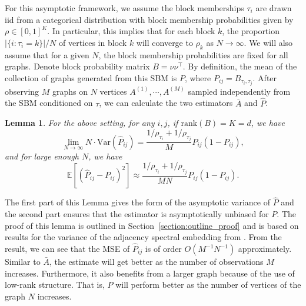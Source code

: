 \documentclass[10pt,letterpaper]{article}
\newtheorem{lemma}[fact]{Lemma}
\newcommand{\Ex}{\mathbb{E}}
\renewcommand{\hat}{\widehat}
\begin{document}
For this asymptotic framework, we assume the block memberships $\tau_i$ are drawn iid from a categorical distribution with block membership probabilities given by $\rho\in[0,1]^K$.
In particular, this implies that for each block $k$, the proportion $|\{i:\tau_i=k\}|/N$ of vertices in block $k$ will converge to $\rho_k$ as $N\to\infty$.
We will also assume that for a given $N$, the block membership probabilities are fixed for all graphs.
Denote block probability matrix $B = \nu \nu^{\top}$. 
By definition, the mean of the collection of graphs generated from this SBM is $P$, where $P_{ij} = B_{\tau_i, \tau_j}$. After observing $M$ graphs on $N$ vertices $A^{(1)}, \cdots, A^{(M)}$ sampled independently from the SBM conditioned on $\tau$, we can calculate the two estimators $\bar{A}$ and $\hat{P}$.

\begin{lemma}
\label{lm:VarPhat}
For the above setting, for any $i, j$, if $\mathrm{rank}(B)=K=d$, we have
\[
    \lim_{N \to \infty} N \cdot \mathrm{Var}(\hat{P}_{ij}) =
    \frac{1/\rho_{\tau_i} + 1/\rho_{\tau_j}}{M} P_{ij} (1 - P_{ij}),
\]
and for large enough $N$, we have
\[
    \Ex[(\hat{P}_{ij} - P_{ij})^2] \approx
    \frac{1/\rho_{\tau_i} + 1/\rho_{\tau_j}}{M N} P_{ij}(1-P_{ij}).
\]
\end{lemma}
The first part of this Lemma gives the form of the asymptotic variance of $\hat{P}$ and the second part ensures that the estimator is asymptotically unbiased for $P$.
The proof of this lemma is outlined in Section~\ref{section:outline_proof} and is based on results for the variance of the adjacency spectral embedding from \citet{athreya2013limit}. From the result, we can see that the MSE of $\hat{P}_{ij}$ is of order $O(M^{-1}N^{-1})$ approximately. Similar to $\bar{A}$, the estimate will get better as the number of observations $M$ increases. Furthermore, it also benefits from a larger graph because of the use of low-rank structure. That is, $\hat{P}$ will perform better as the number of vertices of the graph $N$ increases.
\end{document}
